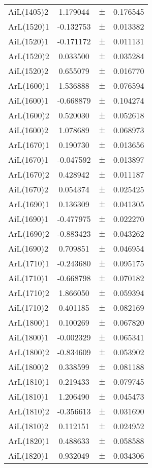 \begin{table}
\begin{tiny}
\begin{tabular}{lccc}
AiL(1405)2 & 1.179044 & $\pm$ & 0.176545 \\
ArL(1520)1 & -0.132753 & $\pm$ & 0.013382 \\
AiL(1520)1 & -0.171172 & $\pm$ & 0.011131 \\
ArL(1520)2 & 0.033500 & $\pm$ & 0.035284 \\
AiL(1520)2 & 0.655079 & $\pm$ & 0.016770 \\
ArL(1600)1 & 1.536888 & $\pm$ & 0.076594 \\
AiL(1600)1 & -0.668879 & $\pm$ & 0.104274 \\
ArL(1600)2 & 0.520030 & $\pm$ & 0.052618 \\
AiL(1600)2 & 1.078689 & $\pm$ & 0.068973 \\
ArL(1670)1 & 0.190730 & $\pm$ & 0.013656 \\
AiL(1670)1 & -0.047592 & $\pm$ & 0.013897 \\
ArL(1670)2 & 0.428942 & $\pm$ & 0.011187 \\
AiL(1670)2 & 0.054374 & $\pm$ & 0.025425 \\
ArL(1690)1 & 0.136309 & $\pm$ & 0.041305 \\
AiL(1690)1 & -0.477975 & $\pm$ & 0.022270 \\
ArL(1690)2 & -0.883423 & $\pm$ & 0.043262 \\
AiL(1690)2 & 0.709851 & $\pm$ & 0.046954 \\
ArL(1710)1 & -0.243680 & $\pm$ & 0.095175 \\
AiL(1710)1 & -0.668798 & $\pm$ & 0.070182 \\
ArL(1710)2 & 1.866050 & $\pm$ & 0.059394 \\
AiL(1710)2 & 0.401185 & $\pm$ & 0.082169 \\
ArL(1800)1 & 0.100269 & $\pm$ & 0.067820 \\
AiL(1800)1 & -0.002329 & $\pm$ & 0.065341 \\
ArL(1800)2 & -0.834609 & $\pm$ & 0.053902 \\
AiL(1800)2 & 0.338599 & $\pm$ & 0.081188 \\
ArL(1810)1 & 0.219433 & $\pm$ & 0.079745 \\
AiL(1810)1 & 1.206490 & $\pm$ & 0.045473 \\
ArL(1810)2 & -0.356613 & $\pm$ & 0.031690 \\
AiL(1810)2 & 0.112151 & $\pm$ & 0.024952 \\
ArL(1820)1 & 0.488633 & $\pm$ & 0.058588 \\
AiL(1820)1 & 0.932049 & $\pm$ & 0.034306 \\

\end{tabular}
\end{tiny}
\end{table}
